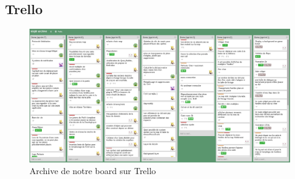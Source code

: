 \subsection{Trello}

\begin{figure}[h!]
	\centering
	\includegraphics[width=1\textwidth]{img/trello_archive.png}
	\caption{Archive de notre board sur Trello}
\end{figure}
